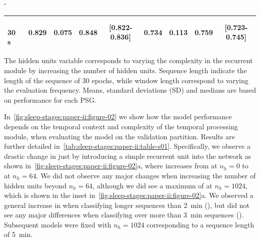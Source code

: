 \begin{table}[t]
\begin{adjustwidth*}{}{-\marginparsep}
\begin{threeparttable}
\begin{tabular}{@{}lcccccccc@{}}
\(\quad\)30 s                     & 0.829         & 0.075       & 0.848           & [0.822-0.836]         & 0.734         & 0.113       & 0.759           & [0.723-0.745]         \\ \bottomrule
\end{tabular}
\begin{tablenotes}
\small \item The hidden units variable corresponds to varying the complexity in the recurrent module by increasing the number of hidden units. Sequence length indicate the length of the sequence of 30 epochs, while window length correspond to varying the evaluation frequency. Means, standard deviations (SD) and medians are based on performance for each \ac{PSG}.
\end{tablenotes}
\end{threeparttable}
\end{adjustwidth*}
\end{table}

In~\cref{fig:sleep-stages:paper-ii:figure-02} we show how the model performance depends on the temporal context and complexity of the temporal processing module, when evaluating the model on the validation partition.
Results are further detailed in~\cref{tab:sleep-stages:paper-ii:table-s01}.
Specifically, we observe a drastic change in \cohen just by introducing a simple recurrent unit into the network as shown in~\cref{fig:sleep-stages:paper-ii:figure-02}a, where \cohen increases from  at $n_h=0$ to  at $n_h=64$. 
We did not observe any major changes when increasing the number of hidden units beyond $n_h=64$, although we did see a maximum \cohen of  at $n_h=1024$, which is shown in the inset in~\cref{fig:sleep-stages:paper-ii:figure-02}a. 
We observed a general increase in \cohen when classifying longer sequences than \SI{2}{\minute} (), but did not see any major differences when classifying over more than \SI{3}{\minute} sequences ().
Subsequent models were fixed with $n_h=1024$ corresponding to a sequence length of \SI{5}{\minute}.

